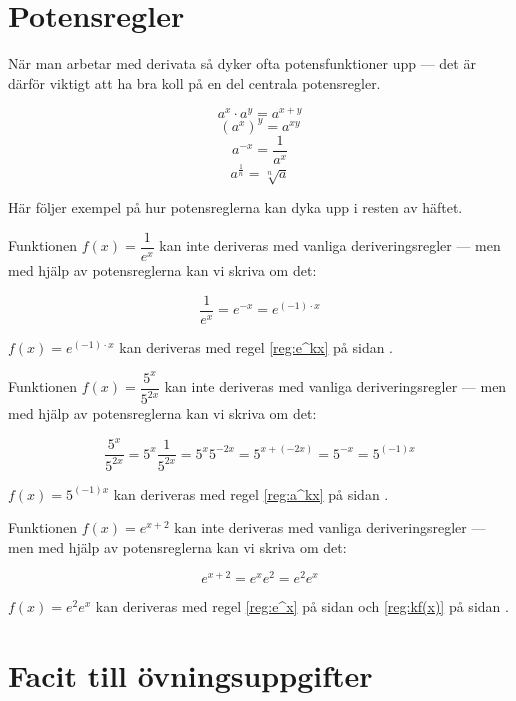 \documentclass[a4paper, 12pt]{article}
\begin{document}
\newpage

\section{Potensregler}
\label{app:pot}
När man arbetar med derivata så dyker ofta potensfunktioner upp --- det är därför viktigt att ha bra koll på en del centrala potensregler.


\begin{regel}
    \[a^x \cdot a^y = a^{x+y} \]
    \[\left(a^x\right)^y = a^{xy}\]
    \[a^{-x} = \dfrac 1{a^x}\]
    \[a^{\frac 1n} = \sqrt[n]a\]
\end{regel}

Här följer exempel på hur potensreglerna kan dyka upp i resten av häftet.


\begin{exempel}
    Funktionen $f(x) = \dfrac1{e^x}$ kan inte deriveras med vanliga deriveringsregler --- men med hjälp av potensreglerna kan vi skriva om det:

    \[\dfrac1{e^x} = e^{-x} = e^{(-1)\cdot x}\]

    $f(x) = e^{(-1)\cdot x}$ kan deriveras med regel \ref*{reg:e^kx} på sidan \pageref*{reg:e^kx}.
\end{exempel}

\begin{exempel}
    Funktionen $f(x) = \dfrac {5^x}{5^{2x}}$ kan inte deriveras med vanliga deriveringsregler --- men med hjälp av potensreglerna kan vi skriva om det:

    \[\dfrac {5^x}{5^{2x}} = 5^x \dfrac 1{5^{2x}} = 5^x 5^{-2x} = 5^{x+(-2x)} = 5^{-x} = 5^{(-1)x}\]

    $f(x) = 5^{(-1)x}$ kan deriveras med regel \ref*{reg:a^kx} på sidan \pageref*{reg:a^kx}.

\end{exempel}

\begin{exempel}
    Funktionen $f(x) = e^{x+2}$ kan inte deriveras med vanliga deriveringsregler --- men med hjälp av potensreglerna kan vi skriva om det:

    \[e^{x+2} = e^xe^2 = e^2e^x\]

    $f(x) = e^2e^x$ kan deriveras med regel \ref*{reg:e^x} på sidan \pageref*{reg:e^x} och \ref*{reg:kf(x)} på sidan \pageref*{reg:kf(x)}.

\end{exempel}

\newpage
\section{Facit till övningsuppgifter}
\end{document}
